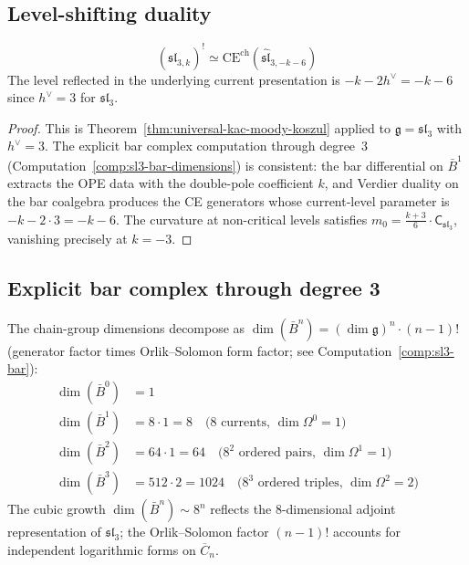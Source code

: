 \subsection{Level-shifting duality}

\begin{theorem}\label{thm:sl3-koszul-dual}
\begin{equation}
(\widehat{\mathfrak{sl}}_{3,k})^!
\simeq
\mathrm{CE}^{\mathrm{ch}}(\widehat{\mathfrak{sl}}_{3,-k-6})
\end{equation}
The level reflected in the underlying current presentation is
$-k - 2h^\vee = -k - 6$ since $h^\vee = 3$ for
$\mathfrak{sl}_3$.
\end{theorem}

\begin{proof}
This is Theorem~\ref{thm:universal-kac-moody-koszul} applied to
$\mathfrak{g} = \mathfrak{sl}_3$ with $h^\vee = 3$. The explicit bar
complex computation through degree~3
(Computation~\ref{comp:sl3-bar-dimensions}) is consistent: the bar
differential on $\bar{B}^1$ extracts the OPE data with the double-pole
coefficient $k$, and Verdier duality on the bar coalgebra produces the
CE generators whose current-level parameter is
$-k - 2 \cdot 3 = -k-6$. The curvature at non-critical levels satisfies
$m_0 = \frac{k+3}{6}\cdot\mathsf C_{\mathfrak{sl}_3}$,
vanishing precisely at $k = -3$.
\end{proof}

\subsection{Explicit bar complex through degree 3}

\begin{computation}\label{comp:sl3-bar-dimensions}
The chain-group dimensions decompose as
$\dim(\bar{B}^n) = (\dim\mathfrak{g})^n \cdot (n-1)!$
(generator factor times Orlik--Solomon form factor;
see Computation~\ref{comp:sl3-bar}):
\begin{align}
\dim(\bar{B}^0) &= 1 \\
\dim(\bar{B}^1) &= 8 \cdot 1 = 8
 \quad \text{($8$ currents, $\dim\Omega^0 = 1$)} \\
\dim(\bar{B}^2) &= 64 \cdot 1 = 64
 \quad \text{($8^2$ ordered pairs, $\dim\Omega^1 = 1$)} \\
\dim(\bar{B}^3) &= 512 \cdot 2 = 1024
 \quad \text{($8^3$ ordered triples, $\dim\Omega^2 = 2$)}
\end{align}
The cubic growth $\dim(\bar{B}^n) \sim 8^n$ reflects the $8$-dimensional adjoint representation of $\mathfrak{sl}_3$; the Orlik--Solomon factor $(n-1)!$ accounts for independent logarithmic forms on $\overline{C}_n$.
\end{computation}

